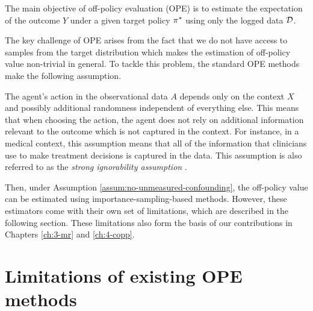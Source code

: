 \begin{importantresultwithtitle}[title=Off-policy evaluation (OPE)]\noindent
    The main objective of off-policy evaluation (OPE) is to estimate the expectation of the outcome $Y$ under a given target policy $\pi^*$ using only the logged data $\mathcal{D}$.
\end{importantresultwithtitle}

The key challenge of OPE arises from the fact that we do not
have access to samples from the target distribution which makes the estimation of off-policy value non-trivial in general.
To tackle this problem, the standard OPE methods make the following assumption.

\begin{assumption}\label{assum:no-unmeasured-confounding}
    The agent's action in the observational data $A$ depends only on the context $X$ and possibly additional randomness independent of everything else. This means that when choosing the action, the agent does not rely on additional information relevant to the outcome which is not captured in the context. For instance, in a medical context, this assumption means that all of the information that clinicians use to make treatment decisions is captured in the data. This assumption is also referred to as the \emph{strong ignorability assumption} \citep{tsiatis2019dynamic}.
\end{assumption}

Then, under Assumption \ref{assum:no-unmeasured-confounding}, the off-policy value can be estimated using importance-sampling-based methods. 
However, these estimators come with their own set of limitations, which are described in the following section. 
These limitations also form the basis of our contributions in Chapters \ref*{ch:3-mr} and \ref*{ch:4-copp}.

\section{Limitations of existing OPE methods}
